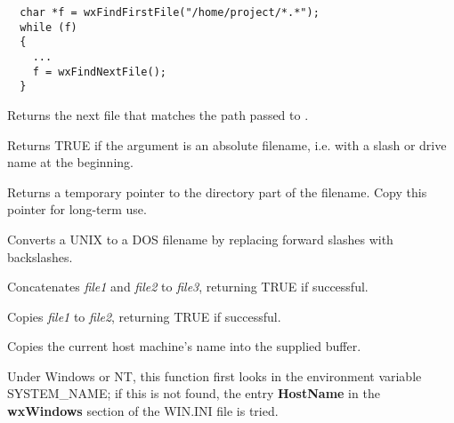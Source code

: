 \begin{verbatim}
  char *f = wxFindFirstFile("/home/project/*.*");
  while (f)
  {
    ...
    f = wxFindNextFile();
  }
\end{verbatim}

\label{wxfindnextfile}


Returns the next file that matches the path passed to .



Returns TRUE if the argument is an absolute filename, i.e. with a slash
or drive name at the beginning.



Returns a temporary pointer to the directory part of the filename. Copy this
pointer for long-term use.



Converts a UNIX to a DOS filename by replacing forward
slashes with backslashes.



Concatenates {\it file1} and {\it file2} to {\it file3}, returning
TRUE if successful.



Copies {\it file1} to {\it file2}, returning TRUE if successful.

\label{wxgethostname}


Copies the current host machine's name into the supplied buffer.

Under Windows or NT, this function first looks in the environment
variable SYSTEM\_NAME; if this is not found, the entry {\bf HostName}\rtfsp
in the {\bf wxWindows} section of the WIN.INI file is tried.

